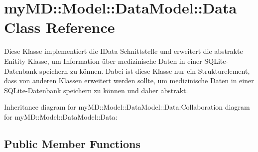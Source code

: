\hypertarget{classmy_m_d_1_1_model_1_1_data_model_1_1_data}{
\section{my\-MD::Model::Data\-Model::Data Class Reference}
\label{db/dac/classmy_m_d_1_1_model_1_1_data_model_1_1_data}
}
Diese Klasse implementiert die IData Schnittstelle und erweitert die abstrakte Enitity Klasse, um Information \"{u}ber medizinische Daten in einer SQLite-Datenbank speichern zu k\"{o}nnen. Dabei ist diese Klasse nur ein Strukturelement, dass von anderen Klassen erweitert werden sollte, um medizinische Daten in einer SQLite-Datenbank speichern zu k\"{o}nnen und daher abstrakt.  


Inheritance diagram for my\-MD::Model::Data\-Model::Data:Collaboration diagram for my\-MD::Model::Data\-Model::Data:\subsection*{Public Member Functions}
